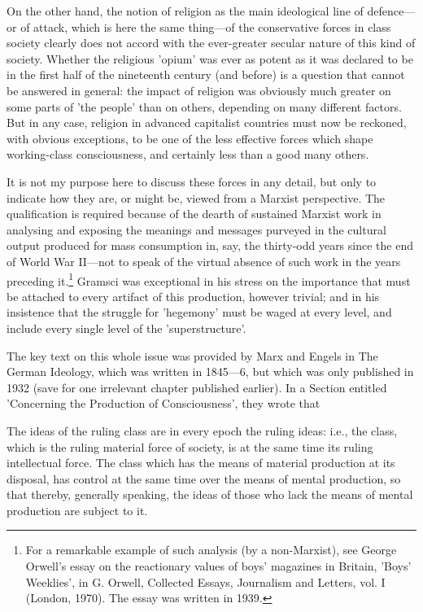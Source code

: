 On the other hand, the notion of religion as the main ideological line of defence—or of attack, which is here the same thing—of the conservative forces in class society clearly does not accord with the ever-greater secular nature of this kind of society. Whether the religious 'opium' was ever as potent as it was declared to be in the first half of the nineteenth century (and before) is a question that cannot be answered in general: the impact of religion was obviously much greater on some parts of 'the people' than on others, depending on many different factors. But in any case, religion in advanced capitalist countries must now be reckoned, with obvious exceptions, to be one of the less effective forces which shape working-class consciousness, and certainly less than a good many others.

It is not my purpose here to discuss these forces in any detail, but only to indicate how they are, or might be, viewed from a Marxist perspective. The qualification is required because of the dearth of sustained Marxist work in analysing and exposing the meanings and messages purveyed in the cultural output produced for mass consumption in, say, the thirty-odd years since the end of World War II—not to speak of the virtual absence of such work in the years preceding it.\footnote{For a remarkable example of such analysis (by a non-Marxist), see George Orwell's essay on the reactionary values of boys' magazines in Britain, 'Boys' Weeklies', in G. Orwell, Collected Essays, Journalism and Letters, vol. I (London, 1970). The essay was written in 1939.} Gramsci was exceptional in his stress on the importance that must be attached to every artifact of this production, however trivial; and in his insistence that the struggle for 'hegemony' must be waged at every level, and include every single level of the 'superstructure'.

The key text on this whole issue was provided by Marx and Engels in The German Ideology, which was written in 1845—6, but which was only published in 1932 (save for one irrelevant chapter published earlier). In a Section entitled 'Concerning the Production of Consciousness', they wrote that
\begin{displayquote}
    The ideas of the ruling class are in every epoch the ruling ideas: i.e., the class, which is the ruling material force of society, is at the same time its ruling intellectual force. The class which has the means of material production at its disposal, has control at the same time over the means of mental production, so that thereby, generally speaking, the ideas of those who lack the means of mental production are subject to it.
\end{displayquote}

